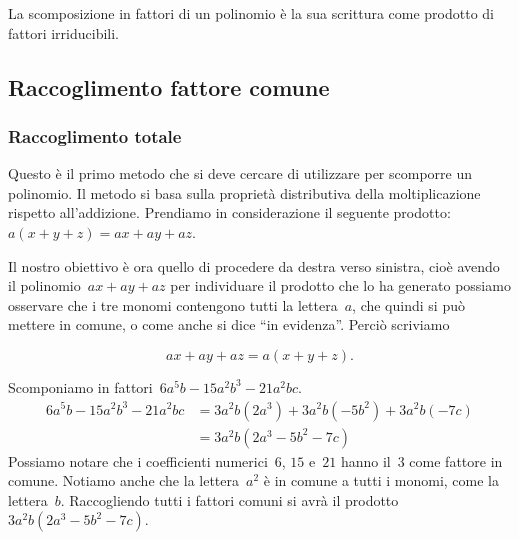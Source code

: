 \begin{definizione}
La scomposizione in fattori di un polinomio è la sua scrittura come prodotto 
di fattori irriducibili.
\end{definizione}

\subsection{Raccoglimento fattore comune}
\label{subsec:divpol_fattorecomune}

\subsubsection{Raccoglimento totale}

Questo è il primo metodo che si deve cercare di utilizzare per scomporre un 
polinomio.
Il metodo si basa sulla proprietà distributiva della moltiplicazione rispetto 
all'addizione.
Prendiamo in considerazione il seguente prodotto:~\(a(x+y+z)=ax+ay+az\).

Il nostro obiettivo è ora quello di procedere da destra verso sinistra, 
cioè avendo il polinomio~\(ax+ay+az\) per individuare il 
prodotto che lo ha generato possiamo osservare che i tre monomi contengono 
tutti la lettera~\(a\), che quindi si può mettere in comune,
o come anche si dice ``in evidenza''. Perciò scriviamo 

\[ax+ay+az=a(x+y+z).\]

 \begin{esempio}
Scomponiamo in fattori~\(6a^{5}b-15a^{2}b^{3}-21a^{2}bc\).
 \begin{equation*}
   \begin{split}
    6a^{5}b-15a^{2}b^{3}-21a^{2}bc 
    &=3a^{2}b(2a^{3})+3a^{2}b(-5b^{2})+3a^{2}b(-7c)\\
    &=3a^{2}b\left(2a^{3}-5b^{2}-7c\right)
   \end{split}
 \end{equation*}
Possiamo notare che i coefficienti numerici~\(6\), \(15\) e~\(21\) hanno il~\(3\) 
come fattore in comune.
Notiamo anche che la lettera~\(a^{2}\) è in comune a tutti i monomi, come la 
lettera~\(b\). 
Raccogliendo tutti i fattori comuni si avrà il prodotto
\(3a^{2}b\left(2a^{3}-5b^{2}-7c\right)\).
 \end{esempio}

